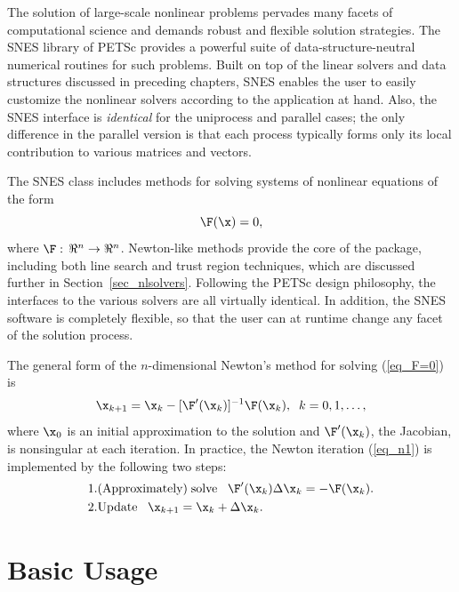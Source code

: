 The solution of large-scale nonlinear problems pervades many facets of
computational science and demands robust and flexible solution
strategies. The SNES library of PETSc provides a powerful suite of
data-structure-neutral numerical routines for such problems.  Built on
top of the linear solvers and data structures discussed in preceding
chapters, SNES enables the user to easily customize the nonlinear
solvers according to the application at hand.  Also, the SNES
interface is {\em identical} for the uniprocess and parallel cases;
the only difference in the parallel version is that each process
typically forms only its local contribution to various matrices and
vectors.

The SNES class includes methods for solving systems of nonlinear equations of the form 
\begin{equation}
\F(\x) = 0,
\label{eq_F=0}
\end{equation}
where $\F: \, \Re^n \to \Re^n$.
Newton-like methods provide the core of the package, including
 both line search  
and trust region  techniques, which are discussed
further in Section~\ref{sec_nlsolvers}. Following the
PETSc design philosophy, the interfaces to the various solvers are all
virtually identical. In addition, the SNES software is completely
flexible, so that the user can at runtime change any facet of the
solution process.

The general form of the $n$-dimensional Newton's method for solving
(\ref{eq_F=0}) is
\begin{equation}
     \x_{k+1} = \x_k - [ \F'(\x_k)]^{-1} \F(\x_k), \;\; k=0,1, \ldots, 
\label{eq_n1}
\end{equation}
where $ \x_0 $ is an initial approximation to the solution and   
$ \F'(\x_k) $, the Jacobian, is nonsingular at each iteration.  
In practice, the Newton iteration (\ref{eq_n1}) is implemented by
the following two steps:
\begin{eqnarray}
  1. & {\rm (Approximately) \;solve\;\;\;} \F'(\x_k) \Delta \x_k = -\F(\x_k).\\
  2. & {\rm Update\;\;\;} \x_{k+1} = \x_k + \Delta \x_k. \hspace{.225in}
\end{eqnarray}


\section{Basic Usage}
\label{sec_snesusage}

